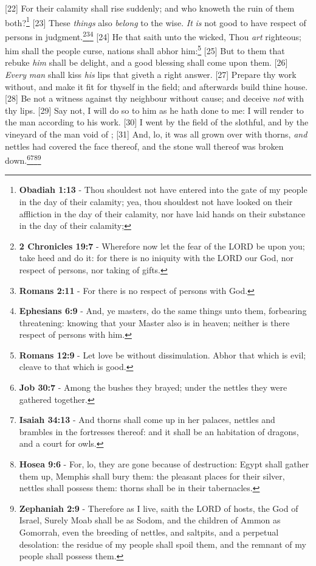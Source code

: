 [22] \textcolor[cmyk]{0.99998,1,0,0}{For their calamity shall rise suddenly; and who knoweth the ruin of them both?}\footnote{\textbf{Obadiah 1:13} - Thou shouldest not have entered into the gate of my people in the day of their calamity; yea, thou shouldest not have looked on their affliction in the day of their calamity, nor have laid hands on their substance in the day of their calamity;}
[23] \textcolor[cmyk]{0.99998,1,0,0}{These \emph{things} also \emph{belong} to the wise. \emph{It} \emph{is} not good to have respect of persons in judgment.}\footnote{\textbf{2 Chronicles 19:7} - Wherefore now let the fear of the LORD be upon you; take heed and do it: for there is no iniquity with the LORD our God, nor respect of persons, nor taking of gifts.}\footnote{\textbf{Romans 2:11} - For there is no respect of persons with God.}\footnote{\textbf{Ephesians 6:9} - And, ye masters, do the same things unto them, forbearing threatening: knowing that your Master also is in heaven; neither is there respect of persons with him.}
[24] \textcolor[cmyk]{0.99998,1,0,0}{He that saith unto the wicked, Thou \emph{art} righteous; him shall the people curse, nations shall abhor him:}\footnote{\textbf{Romans 12:9} - Let love be without dissimulation. Abhor that which is evil; cleave to that which is good.}
[25] \textcolor[cmyk]{0.99998,1,0,0}{But to them that rebuke \emph{him} shall be delight, and a good blessing shall come upon them.}
[26] \textcolor[cmyk]{0.99998,1,0,0}{\emph{Every} \emph{man} shall kiss \emph{his} lips that giveth a right answer.}
[27] \textcolor[cmyk]{0.99998,1,0,0}{Prepare thy work without, and make it fit for thyself in the field; and afterwards build thine house.}
[28] \textcolor[cmyk]{0.99998,1,0,0}{Be not a witness against thy neighbour without cause; and deceive \emph{not} with thy lips.}
[29] \textcolor[cmyk]{0.99998,1,0,0}{Say not, I will do so to him as he hath done to me: I will render to the man according to his work.}
[30] \textcolor[cmyk]{0.99998,1,0,0}{I went by the field of the slothful, and by the vineyard of the man void of ;}
[31] \textcolor[cmyk]{0.99998,1,0,0}{And, lo, it was all grown over with thorns, \emph{and} nettles had covered the face thereof, and the stone wall thereof was broken down.}\footnote{\textbf{Job 30:7} - Among the bushes they brayed; under the nettles they were gathered together.}\footnote{\textbf{Isaiah 34:13} - And thorns shall come up in her palaces, nettles and brambles in the fortresses thereof: and it shall be an habitation of dragons, and a court for owls.}\footnote{\textbf{Hosea 9:6} - For, lo, they are gone because of destruction: Egypt shall gather them up, Memphis shall bury them: the pleasant places for their silver, nettles shall possess them: thorns shall be in their tabernacles.}\footnote{\textbf{Zephaniah 2:9} - Therefore as I live, saith the LORD of hosts, the God of Israel, Surely Moab shall be as Sodom, and the children of Ammon as Gomorrah, even the breeding of nettles, and saltpits, and a perpetual desolation: the residue of my people shall spoil them, and the remnant of my people shall possess them. }
